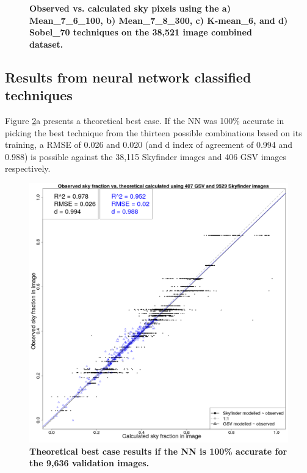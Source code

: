 \documentclass[final,3p,times,authoryear]{elsarticle}
\begin{document}
\begin{figure}
\caption{\textbf{Observed vs. calculated sky pixels using the a) Mean\_7\_6\_100, b) Mean\_7\_8\_300, c) K-mean\_6, and d) Sobel\_70 techniques on the 38,521 image combined dataset.} }
\label{fig:errorallcombined}
\end{figure}

\subsection{Results from neural network classified techniques}\label{sec:resultsnn}
Figure \ref{fig:errorplots}a presents a theoretical best case. If the NN was 100\% accurate in picking the best technique from the thirteen possible combinations based on its training, a RMSE of 0.026 and 0.020 (and d index of agreement of 0.994 and 0.988) is possible against the 38,115 Skyfinder images and 406 GSV images respectively. 

\begin{figure}
\centering
\includegraphics[scale=0.15]{Images/ErrorPlots1Combined.png}

\caption{\textbf{
Theoretical best case results if the NN is 100\% accurate for the 9,636 validation images. 
}}
\label{fig:errorplotscntk} \label{fig:errorplots}
\end{figure}
\end{document}
